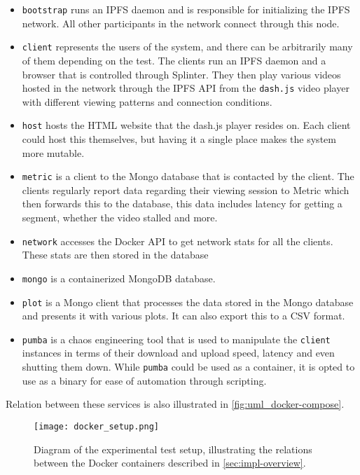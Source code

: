 \begin{itemize}
    \item \texttt{bootstrap} runs an \ac{IPFS} daemon and is responsible for initializing the \ac{IPFS} network. All other participants in the network connect through this node.
    \item \texttt{client} represents the users of the system, and there can be arbitrarily many of them depending on the test. The clients run an \ac{IPFS} daemon and a browser that is controlled through Splinter. They then play various videos hosted in the network through the \ac{IPFS} \ac{API} from the \texttt{dash.js} video player with different viewing patterns and connection conditions.
    \item \texttt{host} hosts the \ac{HTML} website that the dash.js player resides on. Each client could host this themselves, but having it a single place makes the system more mutable.
    \item \texttt{metric} is a client to the Mongo database that is contacted by the client. The clients regularly report data regarding their viewing session to Metric which then forwards this to the database, this data includes latency for getting a segment, whether the video stalled and more.
    \item \texttt{network} accesses the Docker \ac{API} to get network stats for all the clients. These stats are then stored in the database
    \item \texttt{mongo} is a containerized MongoDB database.
    \item \texttt{plot} is a Mongo client that processes the data stored in the Mongo database and presents it with various plots. It can also export this to a \ac{CSV} format.
    \item \texttt{pumba} is a chaos engineering tool that is used to manipulate the \texttt{client} instances in terms of their download and upload speed, latency and even shutting them down. While \texttt{pumba} could be used as a container, it is opted to use as a binary for ease of automation through scripting.
\end{itemize}
Relation between these services is also illustrated in \autoref{fig:uml_docker-compose}.

\begin{figure}[bth]
    \texttt{[image: docker\_setup.png]}
    \caption[Diagram of the experimental test setup]{Diagram of the experimental test setup, illustrating the relations between the Docker containers described in \autoref{sec:impl-overview}.}
    \label{fig:uml_docker-compose}
\end{figure}

